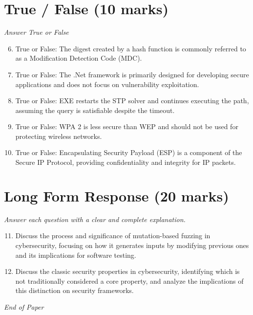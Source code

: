 \documentclass[12pt]{article}
\begin{document}
\section*{True / False (10 marks)}
\textit{Answer True or False}
\begin{enumerate}[label=\arabic*.]
\setcounter{enumi}{5}
\item True or False: The digest created by a hash function is commonly referred to as a Modification Detection Code (MDC).
\item True or False: The .Net framework is primarily designed for developing secure applications and does not focus on vulnerability exploitation.
\item True or False: EXE restarts the STP solver and continues executing the path, assuming the query is satisfiable despite the timeout.
\item True or False: WPA 2 is less secure than WEP and should not be used for protecting wireless networks.
\item True or False: Encapsulating Security Payload (ESP) is a component of the Secure IP Protocol, providing confidentiality and integrity for IP packets.
\end{enumerate}

\section*{Long Form Response (20 marks)}
\textit{Answer each question with a clear and complete explanation.}
\begin{enumerate}[label=\arabic*.]
\setcounter{enumi}{10}
\item Discuss the process and significance of mutation-based fuzzing in cybersecurity, focusing on how it generates inputs by modifying previous ones and its implications for software testing.
\item Discuss the classic security properties in cybersecurity, identifying which is not traditionally considered a core property, and analyze the implications of this distinction on security frameworks.
\end{enumerate}

\vfill
\noindent\textit{End of Paper}
\end{document}
